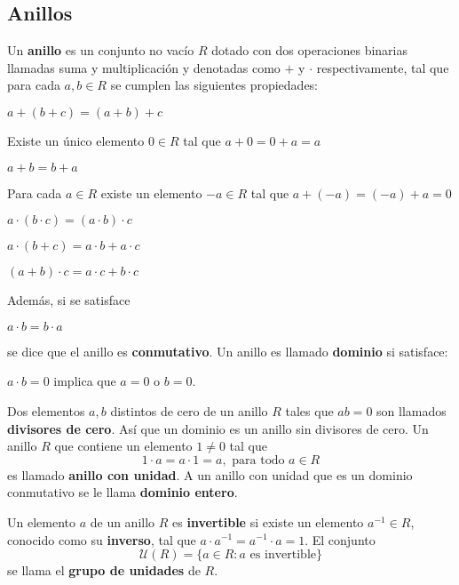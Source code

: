 \subsection{Anillos}
\begin{definicion}
Un \textbf{anillo} es un conjunto no vacío $R$ dotado con dos operaciones binarias llamadas suma y multiplicación y denotadas como $+$ y $\cdot$ respectivamente, tal que para cada $a,b\in R$ se cumplen las siguientes propiedades:
\begin{bulletList}
\item $a+(b+c) = (a+b)+c$
\item Existe un único elemento $0\in R$ tal que $a+0=0+a=a$
\item $a+b=b+a$
\item Para cada $a \in R$ existe un elemento $-a\in R$ tal que $a+(-a) = (-a)+a=0$
\item $a\cdot(b\cdot c) = (a\cdot b)\cdot c$
\item $a\cdot(b+c) = a\cdot b+ a\cdot c$
\item $(a+b)\cdot c= a\cdot c+b\cdot c $
\end{bulletList}
Además, si se satisface
\begin{bulletList}\addtocounter{ContadorLista}{7}
\item $a \cdot b = b\cdot a$
\end{bulletList}
se dice que el anillo es \textbf{conmutativo}.
Un anillo es llamado  \textbf{dominio} si satisface:
\begin{bulletList}\addtocounter{ContadorLista}{8}
\item $a\cdot b = 0$ implica que $a = 0$  o $b = 0$.
\end{bulletList}
\end{definicion}
Dos elementos $a,b$ distintos de cero de un anillo $R$ tales que $ab = 0$ son llamados \textbf{divisores de cero}. Así que un dominio es un anillo sin divisores de cero.
Un anillo $R$ que contiene un elemento $1\neq 0$ tal que \[ 1\cdot a = a \cdot 1 = a, \mbox{ para todo } a \in R \] es llamado \textbf{anillo con unidad}. A un anillo con unidad que es un dominio conmutativo se le llama \textbf{dominio entero}.
\begin{definicion}
Un elemento $a$ de un anillo $R$ es \textbf{invertible} si existe un elemento $a^{-1} \in R$, conocido como su \textbf{inverso}, tal que $a\cdot a^{-1} = a^{-1} \cdot a = 1$. El conjunto \[ \mathcal{U}(R) = \{a \in R \colon a \mbox{ es invertible} \} \] se llama el \textbf{grupo de unidades} de $R$.
\end{definicion}
